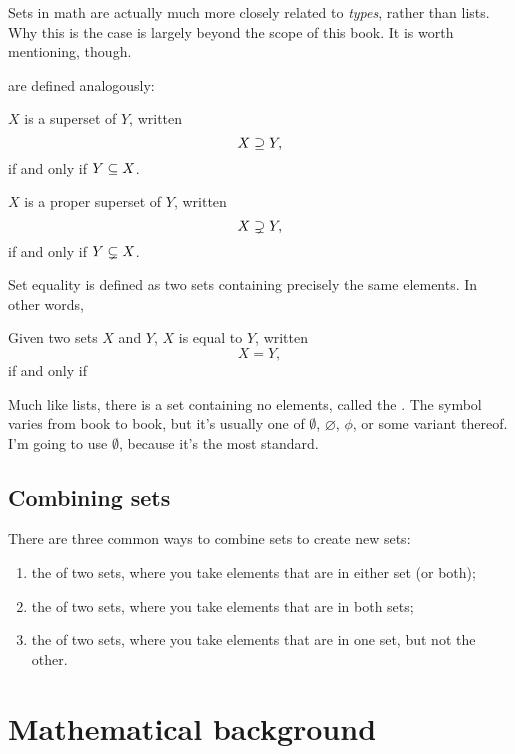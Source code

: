 
\begin{remark}
  Sets in math are actually much more closely related to \emph{types},
  rather than lists. Why this is the case is largely beyond the scope
  of this book. It is worth mentioning, though.
\end{remark}

 are defined analogously:

\begin{definition}
  $X$ is a superset of $Y$, written $$X \supseteq Y,$$ if and only if
  $Y \subseteq X$.
\end{definition}

\begin{definition}
  $X$ is a proper superset of $Y$, written $$X \supsetneq Y,$$ if and
  only if $Y \subsetneq X$.
\end{definition}

Set equality is defined as two sets containing precisely the same
elements. In other words,

\begin{definition}
  Given two sets $X$ and $Y$, $X$ is equal to $Y$, written $$X = Y,$$
  if and only if 
\end{definition}

Much like lists, there is a set containing no elements, called the
. The symbol varies from book to book, but it's usually
one of $\emptyset$, $\varnothing$, $\phi$, or some variant
thereof. I'm going to use $\emptyset$, because it's the most standard.

\subsection{Combining sets}

There are three common ways to combine sets to create new sets:

\begin{enumerate}
\item the  of two sets, where you take elements that are
  in either set (or both);
\item the  of two sets, where you take elements
  that are in both sets;
\item the  of two sets, where you take elements that
  are in one set, but not the other.
\end{enumerate}

\section{Mathematical background}

